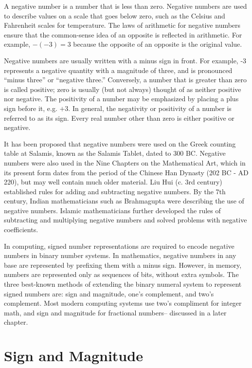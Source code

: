 \documentclass[letterpaper, 12pt]{book}
\begin{document}
A negative number is a number that is less than zero. Negative numbers are used to describe 
values on a scale that goes below zero, such as the Celsius and Fahrenheit scales for 
temperature. The laws of arithmetic for negative numbers ensure that the common-sense idea 
of an opposite is reflected in arithmetic. For example, $-(-3) = 3$ because the opposite of 
an opposite is the original value.

Negative numbers are usually written with a minus sign in front. For example, -3 represents a 
negative quantity with a magnitude of three, and is pronounced ``minus three'' or ``negative 
three.'' Conversely, a number that is greater than zero is called positive; zero is usually 
(but not always) thought of as neither positive nor negative. The positivity of a number may 
be emphasized by placing a plus sign before it, e.g. $+3$. In general, the negativity or 
positivity of a number is referred to as its sign. %
%
Every real number other than zero is either positive or negative. 

It has been proposed that negative numbers were used on the Greek counting table at Salamis, known as the Salamis Tablet, 
dated to 300 BC. Negative numbers were also used in the Nine Chapters on the Mathematical Art, which in its present form 
dates from the period of the Chinese Han Dynasty (202 BC - AD 220), but may well contain much older material. Liu Hui 
(c. 3rd century) established rules for adding and subtracting negative numbers. By the 7th century, Indian mathematicians 
such as Brahmagupta were describing the use of negative numbers. Islamic mathematicians further developed the rules of 
subtracting and multiplying negative numbers and solved problems with negative coefficients. 

In computing, signed number representations are required to encode negative numbers in binary number systems. In 
mathematics, negative numbers in any base are represented by prefixing them with a minus sign. However, in memory, 
numbers are represented only as sequences of bits, without extra symbols. The three best-known methods of extending the 
binary numeral system to represent signed numbers are: sign and magnitude, one's complement, and two's complement. Most 
modern computing systems use two's compliment for integer math, and sign and magnitude for fractional numbers--%
discussed in a later chapter. 

\section{Sign and Magnitude\label{sec:signmag}}
\end{document}
